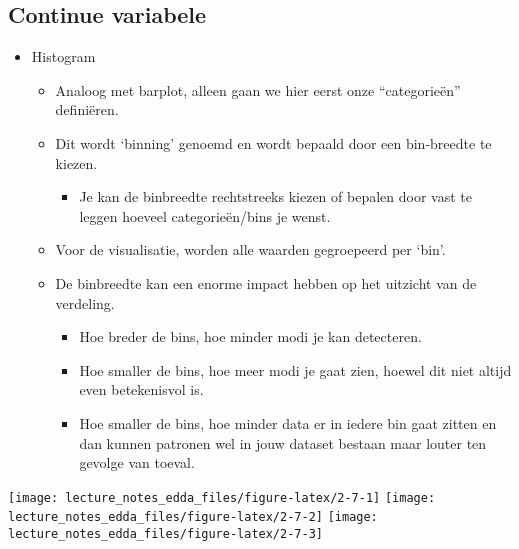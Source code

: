 \documentclass[]{memoir}
\providecommand{\tightlist}{%
  \setlength{\itemsep}{0pt}\setlength{\parskip}{0pt}}
\begin{document}
\hypertarget{continue-variabele}{%
\subsection{Continue variabele}\label{continue-variabele}}

\begin{itemize}
\tightlist
\item
  Histogram

  \begin{itemize}
  \tightlist
  \item
    Analoog met barplot, alleen gaan we hier eerst onze ``categorieën'' definiëren.
  \item
    Dit wordt `binning' genoemd en wordt bepaald door een bin-breedte te kiezen.

    \begin{itemize}
    \tightlist
    \item
      Je kan de binbreedte rechtstreeks kiezen of bepalen door vast te leggen hoeveel categorieën/bins je wenst.
    \end{itemize}
  \item
    Voor de visualisatie, worden alle waarden gegroepeerd per `bin'.
  \item
    De binbreedte kan een enorme impact hebben op het uitzicht van de verdeling.

    \begin{itemize}
    \tightlist
    \item
      Hoe breder de bins, hoe minder modi je kan detecteren.
    \item
      Hoe smaller de bins, hoe meer modi je gaat zien, hoewel dit niet altijd even betekenisvol is.
    \item
      Hoe smaller de bins, hoe minder data er in iedere bin gaat zitten en dan kunnen patronen wel in jouw dataset bestaan maar louter ten gevolge van toeval.
    \end{itemize}
  \end{itemize}
\end{itemize}

\texttt{[image: lecture\_notes\_edda\_files/figure-latex/2-7-1]}
\texttt{[image: lecture\_notes\_edda\_files/figure-latex/2-7-2]}
\texttt{[image: lecture\_notes\_edda\_files/figure-latex/2-7-3]}
\end{document}
